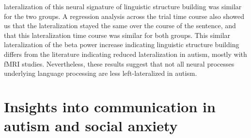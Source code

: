 lateralization of this neural signature of linguistic structure building was similar for the two groups. A regression analysis across the trial time course also showed us that the lateralization stayed the same over the course of the sentence, and that this lateralization time course was similar for both groups. This similar lateralization of the beta power increase indicating linguistic structure building differs from the literature indicating reduced lateralization in autism, mostly with fMRI studies. Nevertheless, these results suggest that not all neural processes underlying language processing are less left-lateralized in autism.  

\section{Insights into communication in autism and social anxiety}
